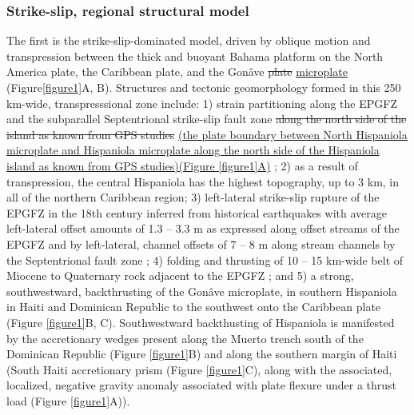 \documentclass[linenumbers,draft]{agujournal}
\providecommand{\DIFadd}[1]{{\protect\color{blue}\uwave{#1}}} %
\providecommand{\DIFdel}[1]{{\protect\color{red}\sout{#1}}}                      %
\providecommand{\DIFaddbegin}{} %
\providecommand{\DIFaddend}{} %
\providecommand{\DIFdelbegin}{} %
\providecommand{\DIFdelend}{} %
\begin{document}
\subsubsection{Strike-slip, regional structural model}
The first is the strike-slip-dominated model, driven by oblique motion and transpression between the thick and buoyant Bahama platform on the North America plate, the Caribbean plate, and the Gon\^ave \DIFdelbegin \DIFdel{plate }\DIFdelend \DIFaddbegin \ul{microplate} \DIFaddend \citep{mann1995actively,dolan1998active,mann2002oblique,calais2002strain,calais2016plate} (Figure\DIFaddbegin \DIFadd{~}\DIFaddend \ref{figure1}A, B). Structures and tectonic geomorphology formed in this 250 km-wide, transpresssional zone include: 1) strain partitioning along the EPGFZ and the subparallel Septentrional strike-slip fault zone \DIFdelbegin \DIFdel{along the north side of the island as known from GPS studies }\DIFdelend \DIFaddbegin \ul{(the plate boundary between North Hispaniola microplate and Hispaniola microplate along the north side of the Hispaniola island as known from GPS studies)(Figure {\ref{figure1}}A)} \DIFaddend \citep{calais2002strain,calais2010transpressional,hayes2010complex,symithe2013coseismic,douilly2013crustal,douilly2015three}; 2) as a result of transpression, the central Hispaniola has the highest topography, up to 3 km, in all of the northern Caribbean region; 3) left-lateral strike-slip rupture of the EPGFZ in the 18th century inferred from historical earthquakes \citep{bakun2012significant} with average left-lateral offset amounts of 1.3 -- 3.3 m as expressed along offset streams of the EPGFZ \citep{prentice2010seismic} and by left-lateral, channel offsets of 7 -- 8 m along stream channels by the Septentrional fault zone \citep{prentice1993paleoseismicity}; 4) folding and thrusting of 10 -- 15 km-wide belt of Miocene to Quaternary rock adjacent to the EPGFZ \citep{saint2015seismotectonics}; and 5) a strong, southwestward, backthrusting of the Gon\^ave microplate, in southern Hispaniola in Haiti and Dominican Republic to the southwest onto the Caribbean plate \citep{mann2002oblique,grindlay2005high,kroehler2011late} (Figure \ref{figure1}B, C). Southwestward backthusting of Hispaniola is manifested by the accretionary wedges present along the Muerto trench south of the Dominican Republic \citep{bien1986contribution,bruna2009morphotectonics} (Figure \ref{figure1}B) and along the southern margin of Haiti (South Haiti accretionary prism \citep{bien1986contribution} (Figure \ref{figure1}C), along with the associated, localized, negative gravity anomaly associated with plate flexure under a thrust load \citep{mann2002oblique,bruna2009morphotectonics} (Figure \ref{figure1}A)).
\end{document}
